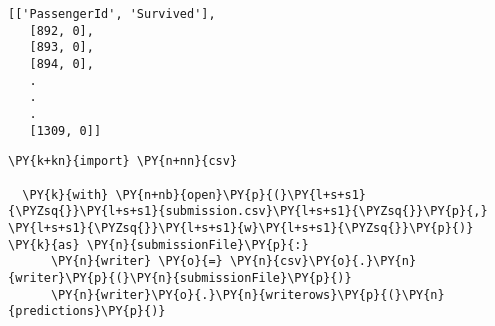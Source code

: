               \begin{tcolorbox}[breakable, size=fbox, boxrule=.5pt, pad at break*=1mm, opacityfill=0]
  \begin{Verbatim}[commandchars=\\\{\}]
  [['PassengerId', 'Survived'],
   [892, 0],
   [893, 0],
   [894, 0],
   .
   .
   .
   [1309, 0]]
  \end{Verbatim}
  \end{tcolorbox}
          
      \begin{tcolorbox}[breakable, size=fbox, boxrule=1pt, pad at break*=1mm,colback=cellbackground, colframe=cellborder]
  \begin{Verbatim}[commandchars=\\\{\}]
  \PY{k+kn}{import} \PY{n+nn}{csv}

  \PY{k}{with} \PY{n+nb}{open}\PY{p}{(}\PY{l+s+s1}{\PYZsq{}}\PY{l+s+s1}{submission.csv}\PY{l+s+s1}{\PYZsq{}}\PY{p}{,} \PY{l+s+s1}{\PYZsq{}}\PY{l+s+s1}{w}\PY{l+s+s1}{\PYZsq{}}\PY{p}{)} \PY{k}{as} \PY{n}{submissionFile}\PY{p}{:}
      \PY{n}{writer} \PY{o}{=} \PY{n}{csv}\PY{o}{.}\PY{n}{writer}\PY{p}{(}\PY{n}{submissionFile}\PY{p}{)}
      \PY{n}{writer}\PY{o}{.}\PY{n}{writerows}\PY{p}{(}\PY{n}{predictions}\PY{p}{)}
  \end{Verbatim}
  \end{tcolorbox}
